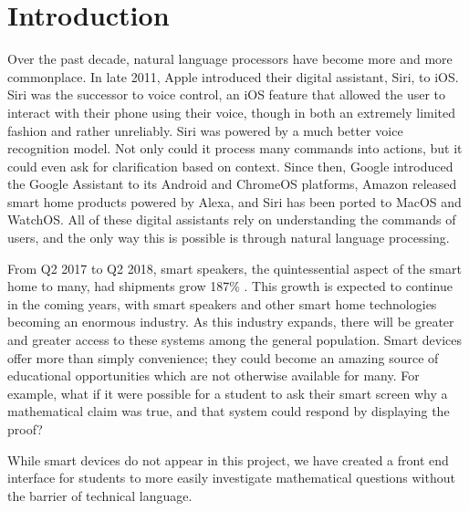 \chapter{Introduction}

Over the past decade, natural language processors have become more and more commonplace. In late 2011, Apple introduced their digital assistant, Siri, to iOS. Siri was the successor to voice control, an iOS feature that allowed the user to interact with their phone using their voice, though in both an extremely limited fashion and rather unreliably. Siri was powered by a much better voice recognition model. Not only could it process many commands into actions, but it could even ask for clarification based on context. Since then, Google introduced the Google Assistant to its Android and ChromeOS platforms, Amazon released smart home products powered by Alexa, and Siri has been ported to MacOS and WatchOS. All of these digital assistants rely on understanding the commands of users, and the only way this is possible is through natural language processing.                                                                                 
                                                                                                           
From Q2 2017 to Q2 2018, smart speakers, the quintessential aspect of the smart home to many, had shipments grow 187\% \cite{canalys}. This growth is expected to continue in the coming years, with smart speakers and other smart home technologies becoming an enormous industry. As this industry expands, there will be greater and greater access to these systems among the general population. Smart devices offer more than simply convenience; they could become an amazing source of educational opportunities which are not otherwise available for many. For example, what if it were possible for a student to ask their smart screen why a mathematical claim was true, and that system could respond by displaying the proof?                                                 
                                                                                                           
While smart devices do not appear in this project, we have created a front end interface for students to 
more easily investigate mathematical questions without the barrier of technical language.               
                                                                                                           
